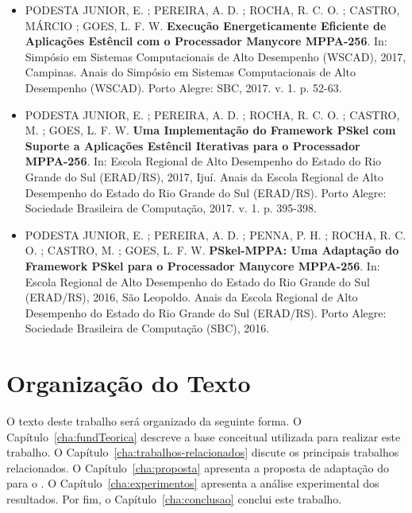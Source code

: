 \begin{itemize}
	\item PODESTA JUNIOR, E. ; PEREIRA, A. D. ; ROCHA, R. C. O. ; CASTRO, MÁRCIO ; GOES, L. F. W. \textbf{Execução Energeticamente Eficiente de Aplicações Estêncil com o Processador Manycore MPPA-256}. In: Simpósio em Sistemas Computacionais de Alto Desempenho (WSCAD), 2017, Campinas. Anais do Simpósio em Sistemas Computacionais de Alto Desempenho (WSCAD). Porto Alegre: SBC, 2017. v. 1. p. 52-63.

	\item PODESTA JUNIOR, E. ; PEREIRA, A. D. ; ROCHA, R. C. O. ; CASTRO, M. ; GOES, L. F. W. \textbf{Uma Implementação do Framework PSkel com Suporte a Aplicações Estêncil Iterativas para o Processador MPPA-256}. In: Escola Regional de Alto Desempenho do Estado do Rio Grande do Sul (ERAD/RS), 2017, Ijuí. Anais da Escola Regional de Alto Desempenho do Estado do Rio Grande do Sul (ERAD/RS). Porto Alegre: Sociedade Brasileira de Computação, 2017. v. 1. p. 395-398.

	\item PODESTA JUNIOR, E. ; PEREIRA, A. D. ; PENNA, P. H. ; ROCHA, R. C. O. ; CASTRO, M. ; GOES, L. F. W. \textbf{PSkel-MPPA: Uma Adaptação do Framework PSkel para o Processador Manycore MPPA-256}. In: Escola Regional de Alto Desempenho do Estado do Rio Grande do Sul (ERAD/RS), 2016, São Leopoldo. Anais da Escola Regional de Alto Desempenho do Estado do Rio Grande do Sul (ERAD/RS). Porto Alegre: Sociedade Brasileira de Computação (SBC), 2016.
\end{itemize}

\section{Organização do Texto}
O texto deste trabalho será organizado da seguinte forma. O Capítulo~\ref{cha:fundTeorica} descreve a base conceitual
utilizada para realizar este trabalho. O Capítulo~\ref{cha:trabalhos-relacionados} discute os principais trabalhos relacionados.
O Capítulo~\ref{cha:proposta} apresenta a proposta de adaptação do \pskel para o \mppa.
O Capítulo~\ref{cha:experimentos} apresenta a análise experimental dos resultados. Por fim, o
Capítulo~\ref{cha:conclusao} conclui este trabalho.


